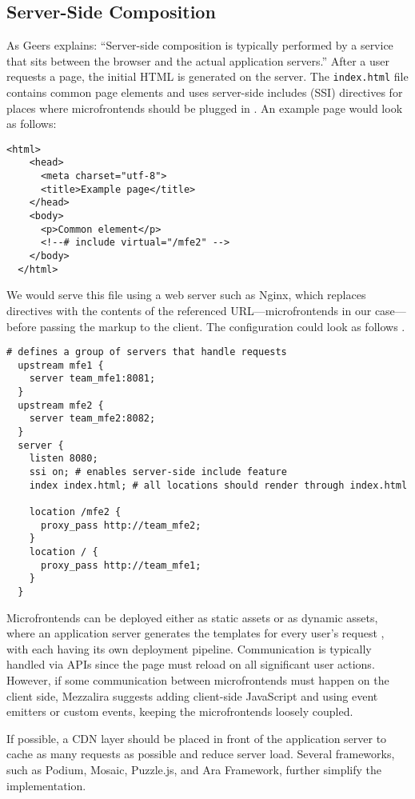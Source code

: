 \subsection{Server-Side Composition}
As Geers explains: ``Server-side composition is typically performed by a service that sits between the browser and the actual application servers.'' After a user requests a page, the initial HTML is generated on the server. The \texttt{index.html} file contains common page elements and uses server-side includes (SSI) directives for places where microfrontends should be plugged in \cite{Jackson}. An example page would look as follows:
\begin{lstlisting}[caption={Example of server-side composition using SSI}]
  <html>
    <head>
      <meta charset="utf-8">
      <title>Example page</title>
    </head>
    <body>
      <p>Common element</p>
      <!--# include virtual="/mfe2" -->
    </body>
  </html>
\end{lstlisting}
We would serve this file using a web server such as Nginx, which replaces directives with the contents of the referenced URL—microfrontends in our case—before passing the markup to the client. The configuration could look as follows \cite{Jackson}.
\begin{lstlisting}[caption={Example of Nginx configuration for server-side composition}]
  # defines a group of servers that handle requests
  upstream mfe1 { 
    server team_mfe1:8081;
  }
  upstream mfe2 {
    server team_mfe2:8082;
  }
  server {
    listen 8080;
    ssi on; # enables server-side include feature
    index index.html; # all locations should render through index.html

    location /mfe2 {
      proxy_pass http://team_mfe2;
    }
    location / {
      proxy_pass http://team_mfe1;
    }
  }
\end{lstlisting}
Microfrontends can be deployed either as static assets or as dynamic assets, where an application server generates the templates for every user's request \cite{MezzaliraBuildingMf}, with each having its own deployment pipeline. Communication is typically handled via APIs since the page must reload on all significant user actions. However, if some communication between microfrontends must happen on the client side, Mezzalira \cite{MezzaliraBuildingMf} suggests adding client-side JavaScript and using event emitters or custom events, keeping the microfrontends loosely coupled.

If possible, a CDN layer should be placed in front of the application server to cache as many requests as possible and reduce server load. Several frameworks, such as Podium, Mosaic, Puzzle.js, and Ara Framework, further simplify the implementation.


